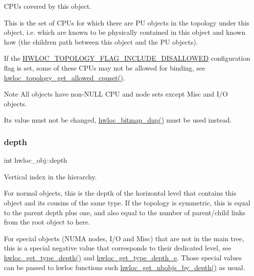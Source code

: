 C\+P\+Us covered by this object. 

This is the set of C\+P\+Us for which there are PU objects in the topology under this object, i.\+e. which are known to be physically contained in this object and known how (the children path between this object and the PU objects).

If the \hyperlink{a00193_ggada025d3ec20b4b420f8038d23d6e7bdea10907044bbb306fd0dc76acf046d9258}{H\+W\+L\+O\+C\+\_\+\+T\+O\+P\+O\+L\+O\+G\+Y\+\_\+\+F\+L\+A\+G\+\_\+\+I\+N\+C\+L\+U\+D\+E\+\_\+\+D\+I\+S\+A\+L\+L\+O\+W\+ED} configuration flag is set, some of these C\+P\+Us may not be allowed for binding, see \hyperlink{a00202_ga517d5d68ec9f24583d8933aab713be8e}{hwloc\+\_\+topology\+\_\+get\+\_\+allowed\+\_\+cpuset()}.

\begin{DoxyNote}{Note}
All objects have non-\/\+N\+U\+LL C\+PU and node sets except Misc and I/O objects.

Its value must not be changed, \hyperlink{a00205_gae679434c1a5f41d3560a8a7e2c1b0dee}{hwloc\+\_\+bitmap\+\_\+dup()} must be used instead. 
\end{DoxyNote}
\mbox{\label{a00238_a4876fd165b4fff35521f07ebd85355ed}} 
\subsubsection{\texorpdfstring{depth}{depth}}
{\footnotesize\ttfamily int hwloc\+\_\+obj\+::depth}



Vertical index in the hierarchy. 

For normal objects, this is the depth of the horizontal level that contains this object and its cousins of the same type. If the topology is symmetric, this is equal to the parent depth plus one, and also equal to the number of parent/child links from the root object to here.

For special objects (N\+U\+MA nodes, I/O and Misc) that are not in the main tree, this is a special negative value that corresponds to their dedicated level, see \hyperlink{a00187_ga8bec782e21be313750da70cf7428b374}{hwloc\+\_\+get\+\_\+type\+\_\+depth()} and \hyperlink{a00187_gaf4e663cf42bbe20756b849c6293ef575}{hwloc\+\_\+get\+\_\+type\+\_\+depth\+\_\+e}. Those special values can be passed to hwloc functions such \hyperlink{a00187_ga1d5ceafe8130fe6e8657bf0bc666ba50}{hwloc\+\_\+get\+\_\+nbobjs\+\_\+by\+\_\+depth()} as usual. \mbox{\label{a00238_af51d08a0a79dba517c06c5afedc8d2dc}} 
